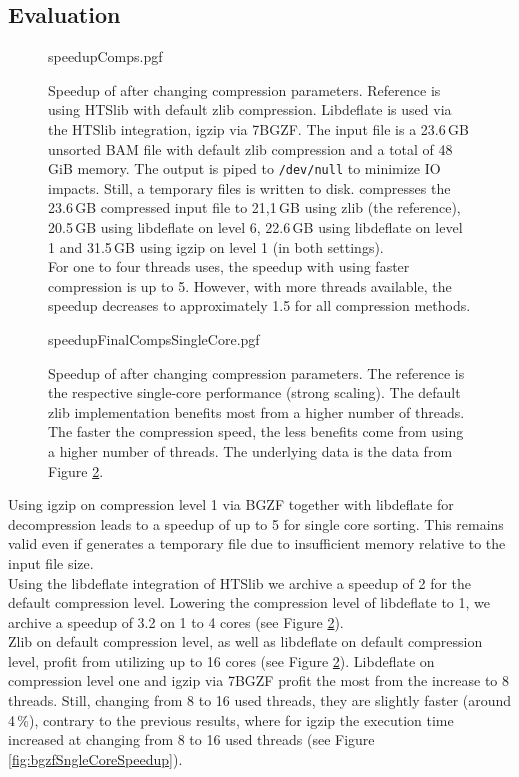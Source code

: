 \subsection{Evaluation}
\begin{figure}[t]
        {speedupComps.pgf}
    \caption{Speedup of \sort after changing compression parameters. Reference is \sort using HTSlib with default zlib compression. Libdeflate is used via the HTSlib integration, igzip via 7BGZF. The input file is a 23.6\,GB unsorted BAM file with default zlib compression and a total of 48\,GiB memory. The output is piped to \texttt{/dev/null} to minimize IO impacts. Still, a temporary files is written to disk. \sort compresses the 23.6\,GB compressed input file to 21,1\,GB using zlib (the reference), 20.5\,GB using libdeflate on level 6, 22.6\,GB using libdeflate on level 1 and 31.5\,GB using igzip on level 1 (in both settings). \\
    For one to four threads \sort uses, the speedup with using faster compression is up to 5. However, with more threads available, the speedup decreases to approximately 1.5 for all compression methods.}
    \label{fig:speedupCompression}
\end{figure}
\begin{figure}[!h]
        {speedupFinalCompsSingleCore.pgf}
    \caption{Speedup of \sort after changing compression parameters. The reference is the respective single-core performance (strong scaling). The default zlib implementation benefits most from a higher number of threads. The faster the compression speed, the less benefits come from using a higher number of threads. The underlying data is the data from Figure \ref{fig:speedupCompression}.}
    \label{fig:speedupCompression}
\end{figure}
Using igzip on compression level 1 via BGZF together with libdeflate for decompression leads to a speedup of up to 5 for single core sorting. This remains valid even if \sort generates a temporary file due to insufficient memory relative to the input file size. \\
Using the libdeflate integration of HTSlib we archive a speedup of 2 for the default compression level. Lowering the compression level of libdeflate to 1, we archive a speedup of 3.2 on 1 to 4 cores (see Figure \ref{fig:speedupCompression}). \\
Zlib on default compression level, as well as libdeflate on default compression level, profit from utilizing up to 16 cores (see Figure \ref{fig:speedupCompression}). Libdeflate on compression level one and igzip via 7BGZF profit the most from the increase to 8 threads. Still, changing from 8 to 16 used threads, they are  slightly faster (around 4\,\%), contrary to the previous results, where for igzip the execution time increased at changing from 8 to 16 used threads (see Figure \ref{fig:bgzfSngleCoreSpeedup}). \\

